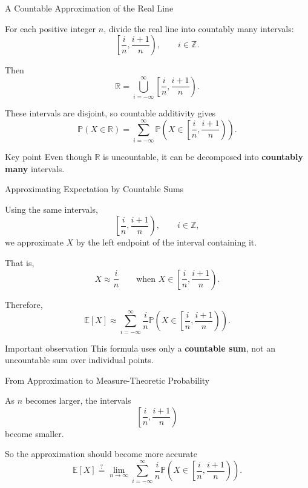 \documentclass [aspectratio=169]{beamer}
\begin{document}
\begin{frame}{A Countable Approximation of the Real Line}

For each positive integer $n$, divide the real line into countably many intervals:
\[
    \left[\frac{i}{n}, \frac{i+1}{n}\right),
    \qquad i \in \mathbb Z.
\]

Then
\[
    \mathbb R
    =
    \bigcup_{i=-\infty}^{\infty}
    \left[\frac{i}{n}, \frac{i+1}{n}\right).
\]

These intervals are disjoint, so countable additivity gives
\[
    \mathbb P(X \in \mathbb R)
    =
    \sum_{i=-\infty}^{\infty}
    \mathbb P\left(
        X \in
        \left[\frac{i}{n}, \frac{i+1}{n}\right)
    \right).
\]

\vspace{3mm}

\begin{block}{Key point}
Even though $\mathbb R$ is uncountable, it can be decomposed into \textbf{countably many} intervals.
\end{block}

\end{frame}

\begin{frame}{Approximating Expectation by Countable Sums}

Using the same intervals,
\[
    \left[\frac{i}{n}, \frac{i+1}{n}\right),
    \qquad i \in \mathbb Z,
\]
we approximate $X$ by the left endpoint of the interval containing it.

That is,
\[
    X
    \approx
    \frac{i}{n}
    \qquad
    \text{when }
    X \in
    \left[\frac{i}{n}, \frac{i+1}{n}\right).
\]

Therefore,
\[
    \mathbb E[X]
    \approx
    \sum_{i=-\infty}^{\infty}
    \frac{i}{n}
    \mathbb P\left(
        X \in
        \left[\frac{i}{n}, \frac{i+1}{n}\right)
    \right).
\]

\vspace{3mm}

\begin{block}{Important observation}
This formula uses only a \textbf{countable sum}, not an uncountable sum over individual points.
\end{block}

\end{frame}

\begin{frame}{From Approximation to Measure-Theoretic Probability}

As $n$ becomes larger, the intervals
\[
    \left[\frac{i}{n}, \frac{i+1}{n}\right)
\]
become smaller.

So the approximation should become more accurate
\[
    \mathbb E[X] \overset{?}{=} \lim_{n\to \infty}\sum_{i=-\infty}^{\infty}
    \frac{i}{n}
    \mathbb P\left(
        X \in
        \left[\frac{i}{n}, \frac{i+1}{n}\right)
    \right).
\]


\end{frame}
\end{document}
